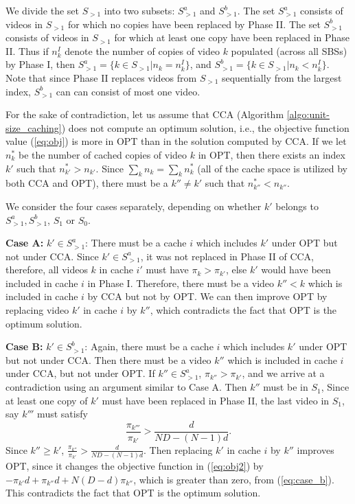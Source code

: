 \documentclass[conference]{IEEEtran}
\begin{document}
We divide the set $S_{>1}$ into two subsets: $S^a_{>1}$ and $S^b_{>1}$. The set $S^a_{>1}$ consists of videos in 
$S_{>1}$ for which no copies  have been replaced by Phase II. The set $S^b_{>1}$ consists of videos in 
$S_{>1}$ for which at least one copy have been replaced in Phase II. Thus if $n^I_k$ denote the number of copies of video $k$ populated (across all SBSs) by Phase I, then $S^a_{>1} = \{ k \in S_{>1} | n_k = n^I_k \}$, and $S^b_{>1} = \{ k \in S_{>1} | n_k < n^I_k \}$. Note that since Phase II replaces videos from $S_{>1}$ sequentially from the largest index, $S^b_{>1}$ can can consist of most one video. 

For the sake of contradiction, let us assume that CCA (Algorithm \ref{algo:unit-size_caching}) does not compute an optimum solution, i.e., the objective function value (\ref{eq:obj}) is more in OPT than in the solution computed by CCA. If we let $n^*_k$ be the number of cached copies of video $k$ in OPT, then there exists an index $k'$ such that $n^*_{k'} > n_{k'}$. 
Since $\sum_k n_k = \sum_k n^*_k$ (all of the cache space is utilized by both CCA and OPT), there must be a $k'' \neq k'$ such that $n^*_{k''} < n_{k''}$. 

We consider the four cases separately, depending on whether $k'$ belongs to $S^a_{>1}, S^b_{>1}$, $S_{1}$ or $S_{0}$. 

\noindent \textbf{Case A:} \underline{$k' \in S^a_{>1}$}: There must be a cache $i$ which includes $k'$ under OPT but not under CCA. Since $k' \in S^a_{>1}$, it was not replaced in Phase II of CCA, therefore, all videos $k$ in cache $i'$ must have $\pi_k > \pi_{k'}$, else $k'$ would have been included in cache $i$ in Phase I. Therefore, there must be a video $k'' < k$ which is included in cache $i$ by CCA but not by OPT. We can then improve OPT by replacing video $k'$ in cache $i$ by $k''$, which contradicts the fact that OPT is the optimum solution.

\noindent \textbf{Case B:} \underline{$k' \in S^b_{>1}$}: Again, there must be a cache $i$ which includes $k'$ under OPT but not under CCA. Then there must be a video $k''$ which is included in cache $i$ under CCA, but not under OPT. If $k'' \in S^a_{>1}$, $\pi_{k''} > \pi_{k'}$, and we arrive at a contradiction using an argument similar to Case A. Then $k''$ must be in $S_1$, Since at least one copy of $k'$ must have been replaced in Phase II, the last video in $S_1$, say $k'''$ must satisfy
\begin{equation}
\frac{\pi_{k'''}}{\pi_{k'}} > \frac{d}{ND - (N-1)d}.
\label{eq:case_b}
\end{equation} Since $k'' \geq k'$, $\frac{\pi_{k''}}{\pi_{k'}} > \frac{d}{ND - (N-1)d}$. Then replacing $k'$ in cache $i$ by $k''$ improves OPT, since it changes the objective function in (\ref{eq:obj2}) by $-\pi_{k'} d + \pi_{k''} d + N (D-d) \pi_{k''}$, which is greater than zero, from (\ref{eq:case_b}). This contradicts the fact that OPT is the optimum solution.
\end{document}
